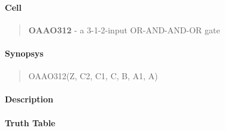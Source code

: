 \label{OAAO312}
\paragraph{Cell}
\begin{quote}
    \textbf{OAAO312} - a 3-1-2-input OR-AND-AND-OR gate
\end{quote}

\paragraph{Synopsys}
\begin{quote}
    OAAO312(Z, C2, C1, C, B, A1, A)
\end{quote}

\paragraph{Description}

%

\paragraph{Truth Table}
%

